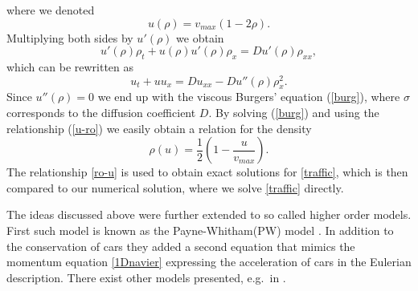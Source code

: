 \documentclass[../include.tex]{subfiles}
\begin{document}
where we denoted
\begin{equation}
	u(\rho) = v_{max}(1 - 2\rho).
	\label{u-ro}
\end{equation}
Multiplying both sides by $ u'(\rho) $ we obtain
\[ u'(\rho)\rho_t + u(\rho)u'(\rho)\rho_x = D u'(\rho)\rho_{xx},\]
which can be rewritten as
\[ u_t + uu_x = D u_{xx} - D u''(\rho) \rho_x^2. \]
Since $ u''(\rho) = 0 $ we end up with the viscous Burgers' equation (\ref{burg}), where $ \sigma $ corresponds to the diffusion coefficient $ D $. By solving (\ref{burg}) and using the relationship (\ref{u-ro}) we easily obtain a relation for the density
\begin{equation}
	\rho(u) = \frac{1}{2}\left(1 - \frac{u}{v_{max}}\right).
	\label{ro-u}
\end{equation}
The relationship \eqref{ro-u} is used to obtain exact solutions for \eqref{traffic}, which is then compared to our numerical solution, where we solve \eqref{traffic} directly.

The ideas discussed above were further extended to so called higher order models. First such model is known as the Payne-Whitham(PW) model \cite{kachroo-sastry, trafficmono, whitham}. In addition to the conservation of cars they added a second equation that mimics the momentum equation \eqref{1Dnavier} expressing the acceleration of cars in the Eulerian description.
There exist other models presented, e.g.\ in \cite{trafficmono, awrascle, zhang}.
\end{document}
